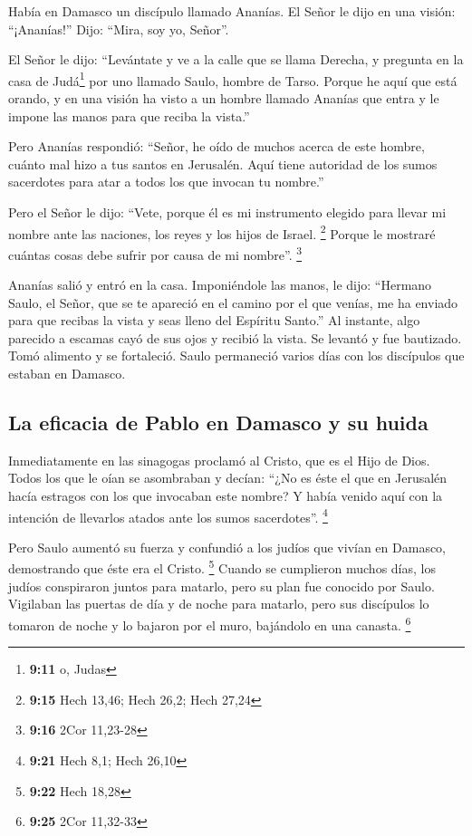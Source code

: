  Había en Damasco un discípulo llamado Ananías. El Señor
le dijo en una visión: ``¡Ananías!'' Dijo: ``Mira, soy yo, Señor''.

 El Señor le dijo: ``Levántate y ve a la calle que se
llama Derecha, y pregunta en la casa de Judá\footnote{\textbf{9:11} o,
  Judas} por uno llamado Saulo, hombre de Tarso. Porque he aquí que está
orando,  y en una visión ha visto a un hombre llamado
Ananías que entra y le impone las manos para que reciba la vista.''

 Pero Ananías respondió: ``Señor, he oído de muchos
acerca de este hombre, cuánto mal hizo a tus santos en Jerusalén.
 Aquí tiene autoridad de los sumos sacerdotes para atar a
todos los que invocan tu nombre.''

 Pero el Señor le dijo: ``Vete, porque él es mi
instrumento elegido para llevar mi nombre ante las naciones, los reyes y
los hijos de Israel. \footnote{\textbf{9:15} Hech 13,46; Hech 26,2; Hech
  27,24}  Porque le mostraré cuántas cosas debe sufrir
por causa de mi nombre''. \footnote{\textbf{9:16} 2Cor 11,23-28}

 Ananías salió y entró en la casa. Imponiéndole las
manos, le dijo: ``Hermano Saulo, el Señor, que se te apareció en el
camino por el que venías, me ha enviado para que recibas la vista y seas
lleno del Espíritu Santo.''  Al instante, algo parecido a
escamas cayó de sus ojos y recibió la vista. Se levantó y fue bautizado.
 Tomó alimento y se fortaleció. Saulo permaneció varios
días con los discípulos que estaban en Damasco.

\hypertarget{la-eficacia-de-pablo-en-damasco-y-su-huida}{%
\subsection{La eficacia de Pablo en Damasco y su
huida}\label{la-eficacia-de-pablo-en-damasco-y-su-huida}}

 Inmediatamente en las sinagogas proclamó al Cristo, que
es el Hijo de Dios.  Todos los que le oían se asombraban
y decían: ``¿No es éste el que en Jerusalén hacía estragos con los que
invocaban este nombre? Y había venido aquí con la intención de llevarlos
atados ante los sumos sacerdotes''. \footnote{\textbf{9:21} Hech 8,1;
  Hech 26,10}

 Pero Saulo aumentó su fuerza y confundió a los judíos
que vivían en Damasco, demostrando que éste era el Cristo. \footnote{\textbf{9:22}
  Hech 18,28}  Cuando se cumplieron muchos días, los
judíos conspiraron juntos para matarlo,  pero su plan fue
conocido por Saulo. Vigilaban las puertas de día y de noche para
matarlo,  pero sus discípulos lo tomaron de noche y lo
bajaron por el muro, bajándolo en una canasta. \footnote{\textbf{9:25}
  2Cor 11,32-33}

